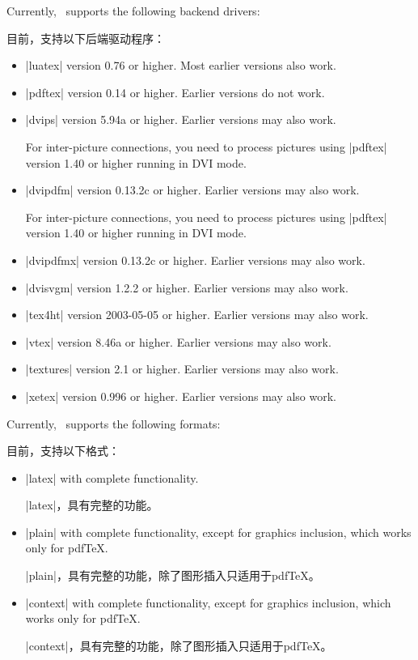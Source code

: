 Currently, \pgfname\ supports the following backend drivers:

目前，\pgfname 支持以下后端驱动程序：
%
\begin{itemize}
    \item |luatex| version 0.76 or higher. Most earlier versions also work.
    \item |pdftex| version 0.14 or higher. Earlier versions do not work.
    \item |dvips| version 5.94a or higher. Earlier versions may also work.

        For inter-picture connections, you need to process pictures using
        |pdftex| version 1.40 or higher running in DVI mode.
    \item |dvipdfm| version 0.13.2c or higher. Earlier versions may also
        work.

        For inter-picture connections, you need to process pictures using
        |pdftex| version 1.40 or higher running in DVI mode.
    \item |dvipdfmx| version 0.13.2c or higher. Earlier versions may also
        work.
    \item |dvisvgm| version 1.2.2 or higher. Earlier versions may also work.
    \item |tex4ht| version 2003-05-05 or higher. Earlier versions may also
        work.
    \item |vtex| version 8.46a or higher. Earlier versions may also work.
    \item |textures| version 2.1 or higher. Earlier versions may also work.
    \item |xetex| version 0.996 or higher. Earlier versions may also work.
\end{itemize}

Currently, \pgfname\ supports the following formats:

目前，\pgfname 支持以下格式：
%
\begin{itemize}
    \item |latex| with complete functionality.

    |latex|，具有完整的功能。
    \item |plain| with complete functionality, except for graphics inclusion,
        which works only for pdf\TeX.

        |plain|，具有完整的功能，除了图形插入只适用于pdf\TeX。
    \item |context| with complete functionality, except for graphics
        inclusion, which works only for pdf\TeX.

        |context|，具有完整的功能，除了图形插入只适用于pdf\TeX。
\end{itemize}

